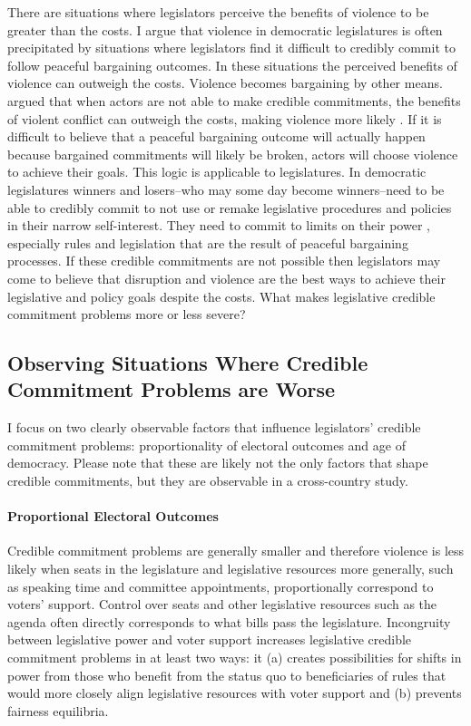 \documentclass[a4paper]{article}\usepackage[]{graphicx}\usepackage[]{color}
\begin{document}
There are situations where legislators perceive the benefits of violence to be greater than the costs. I argue that violence in democratic legislatures is often precipitated by situations where legislators find it difficult to credibly commit to follow peaceful bargaining outcomes. In these situations the perceived benefits of violence can outweigh the costs. Violence becomes bargaining by other means. \cite{Fearon1995} argued that when actors are not able to make credible commitments, the benefits of violent conflict can outweigh the costs, making violence more likely \cite[see also][]{Powell2006}. If it is difficult to believe that a peaceful bargaining outcome will actually happen because bargained commitments will likely be broken, actors will choose violence to achieve their goals. This logic is applicable to legislatures. In democratic legislatures winners and losers--who may some day become winners--need to be able to credibly commit to not use or remake legislative procedures and policies in their narrow self-interest. They need to commit to limits on their power \citep{riker1982,Gaubatz1996}, especially rules and legislation that are the result of peaceful bargaining processes. If these credible commitments are not possible then legislators may come to believe that disruption and violence are the best ways to achieve their legislative and policy goals despite the costs. What makes legislative credible commitment problems more or less severe?

\subsection*{Observing Situations Where Credible Commitment Problems are Worse}

I focus on two clearly observable factors that influence legislators' credible commitment problems: proportionality of electoral outcomes and age of democracy. Please note that these are likely not the only factors that shape credible commitments, but they are observable in a cross-country study.

\paragraph{Proportional Electoral Outcomes}

Credible commitment problems are generally smaller and therefore violence is less likely when seats in the legislature and legislative resources more generally, such as speaking time and committee appointments, proportionally correspond to voters' support. Control over seats and other legislative resources such as the agenda often directly corresponds to what bills pass the legislature. Incongruity between legislative power and voter support increases legislative credible commitment problems in at least two ways: it (a) creates possibilities for shifts in power from those who benefit from the status quo to beneficiaries of rules that would more closely align legislative resources with voter support and (b) prevents fairness equilibria.
\end{document}
